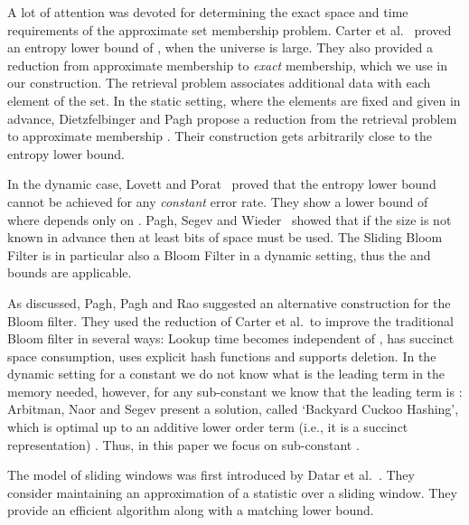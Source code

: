 \documentclass[11pt]{article}
\begin{document}
A lot of attention was devoted for determining the exact space and time requirements of the approximate set membership problem. Carter et al.~\cite{CarterFGMW78} proved an entropy lower bound of , when the universe  is large. They also provided a reduction from approximate membership to {\em exact} membership, which we use in our construction. The retrieval problem associates additional data with each element of the set. In the static setting, where the elements are fixed and given in advance, Dietzfelbinger and Pagh propose a reduction from the retrieval problem to approximate membership \cite{DietzfelbingerP08}. Their construction gets arbitrarily close to the entropy lower bound.

In the dynamic case, Lovett and Porat~\cite{LovettP10} proved that the entropy lower bound cannot be achieved for any {\em constant} error rate. They show a lower bound of  where  depends only on . Pagh, Segev and Wieder~\cite{PaghSW12} showed that if the size  is not known in advance then at least  bits of space must be used. The Sliding Bloom Filter is in particular also a Bloom Filter in a dynamic setting, thus the \cite{LovettP10} and~\cite{PaghSW12} bounds are applicable.

As discussed, Pagh, Pagh and Rao \cite{PaghPR05} suggested an alternative construction for the Bloom filter. They used the reduction of Carter et al.\ to improve the traditional Bloom filter in several ways: Lookup time becomes  independent of , has succinct space consumption, uses explicit hash functions and supports deletion. In the dynamic setting for a constant  we do not know what is the leading term in the memory needed, however, for any sub-constant  we know that the leading term is : Arbitman, Naor and Segev present a solution, called `Backyard Cuckoo Hashing', which is optimal up to an additive lower order term (i.e., it is a succinct representation) \cite{ArbitmanNS10}. Thus, in this paper we focus on sub-constant .

The model of sliding windows was first introduced by Datar et al.~\cite{DatarGIM02}. They consider maintaining an approximation of a statistic over a sliding window. They provide an efficient algorithm along with a matching lower bound.
\end{document}
